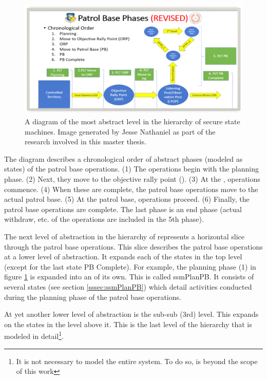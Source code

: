 \documentclass[../../main/main.tex]{subfiles}
\begin{document}
\begin{figure}[h]
\includegraphics[width=\textwidth]{../figures/pbtoplevel}
\caption{\label{pbtoplevel}A diagram of the most abstract level in the hierarchy of secure state machines.  Image generated by Jesse Nathaniel as part of the research involved in this master thesis.}
\end{figure}

The diagram describes a chronological order of abstract phases (modeled as states) of the patrol base operations.  (1) The operations begin with the planning phase. (2)  Next, they move to the objective rally point (). (3) At the , operations commence. (4)  When these are complete, the patrol base operations move to the actual patrol base.  (5)  At the patrol base, operations proceed.  (6)  Finally, the patrol base operations are complete.  The last phase is an end phase (actual withdraw, etc. of the operations are included in the 5th phase).


The next level of abstraction in the hierarchy of  represents a horizontal slice through the patrol base operations. This slice describes the patrol base operations at a lower level of abstraction.  It expands each of the states in the top level (except for the last state PB Complete).  For example, the planning phase (1) in figure \ref{pbtoplevel} is expanded into an  of its own.  This is called ssmPlanPB.  It consists of several states (see section \ref{sssec:ssmPlanPB}) which detail activities conducted during the planning phase of the patrol base operations. 

At yet another lower level of abstraction is the sub-sub (3rd) level.  This expands on the states in the level above it.  This is the last level of the hierarchy that is modeled in detail\footnote{It is not necessary to model the entire system.  To do so, is beyond the scope of this work}.
\end{document}

